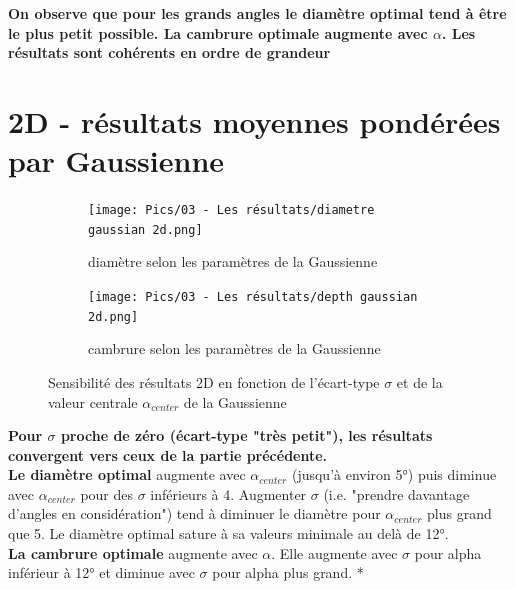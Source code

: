 \textbf{On observe que pour les grands angles le diamètre optimal tend à être le plus petit possible. La cambrure optimale augmente avec $\alpha$. Les résultats sont cohérents en ordre de grandeur}


\section{2D - résultats moyennes pondérées par Gaussienne}
\label{sec:Ch3.2}


\begin{figure}[h!]
    \centering
    \begin{subfigure}[b]{0.45\textwidth}
        \centering
        \texttt{[image: Pics/03 - Les résultats/diametre gaussian 2d.png]}
        \caption{diamètre selon les paramètres de la Gaussienne}
        \label{fig:diametre gaussien 2d}
    \end{subfigure}
    \hfill 
    \begin{subfigure}[b]{0.45\textwidth}
        \centering
        \texttt{[image: Pics/03 - Les résultats/depth gaussian 2d.png]}
        \caption{cambrure selon les paramètres de la Gaussienne}
        \label{fig:cambrure gaussien 2d}
    \end{subfigure}
    \caption{Sensibilité des résultats 2D en fonction de l'écart-type $\sigma$ et de la valeur centrale $\alpha_{center}$ de la Gaussienne}
    \label{fig:gaussian sensibility 2d}
\end{figure}

\textbf{Pour $\sigma$ proche de zéro (écart-type "très petit"), les résultats convergent vers ceux de la partie précédente. }\\

\textbf{Le diamètre optimal} augmente avec $\alpha_{center}$ (jusqu'à environ 5°) puis diminue avec $\alpha_{center}$ pour des $\sigma$ inférieurs à 4. Augmenter $\sigma$ (i.e. "prendre davantage d'angles en considération") tend à diminuer le diamètre pour $\alpha_{center}$ plus grand que 5. Le diamètre optimal sature à sa valeurs minimale au delà de 12°. \\

\textbf{La cambrure optimale} augmente avec $\alpha$. Elle augmente avec $\sigma$ pour alpha inférieur à 12° et diminue avec $\sigma$ pour alpha plus grand.
*

